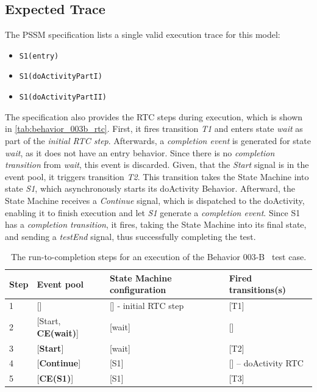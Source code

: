 \subsection{Expected Trace}

The PSSM specification lists a single valid execution trace for this model:

\begin{itemize}
    \item \verb|S1(entry)|
    \item \verb|S1(doActivityPartI)|
    \item \verb|S1(doActivityPartII)|
\end{itemize}

The specification also provides the RTC steps during execution, which is shown in \autoref{tab:behavior_003b_rtc}. First, it fires transition \emph{T1} and enters state \emph{wait} as part of the \emph{initial RTC step}. Afterwards, a \emph{completion event} is generated for state \emph{wait}, as it does not have an entry behavior. Since there is no \emph{completion transition} from \emph{wait}, this event is discarded. Given, that the \emph{Start} signal is in the event pool, it triggers transition \emph{T2}. This transition takes the State Machine into state \emph{S1}, which asynchronously starts its doActivity Behavior. Afterward, the State Machine receives a \emph{Continue} signal, which is dispatched to the doActivity, enabling it to finish execution and let \emph{S1} generate a \emph{completion event}. Since S1 has a \emph{completion transition}, it fires, taking the State Machine into its final state, and sending a \emph{testEnd} signal, thus successfully completing the test.

\begin{table}[htbp]
\centering
\begin{tabular}{|l||l|l|l|}
\hline
\textbf{Step} & \textbf{Event pool} & \textbf{State Machine configuration} & \textbf{Fired transitions(s)} \\ \hline\hline
1    & {[}{]}              & {[}{]} - initial RTC step   & {[}T1{]}             \\ \hline
2    & {[}Start, \textbf{CE(wait)}{]} & {[}wait{]}                    & {[}{]}               \\ \hline
3    & {[}\textbf{Start}{]}         & {[}wait{]}                    & {[}T2{]}             \\ \hline
4    & {[}\textbf{Continue}{]}         & {[}S1{]}                    & {[}{]} -- doActivity RTC             \\ \hline
5    & {[}\textbf{CE(S1)}{]}         & {[}S1{]}                    & {[}T3{]}             \\ \hline
\end{tabular}
\caption{The run-to-completion steps for an execution of the Behavior 003-B~\cite{pssm} test case.}
\label{tab:behavior_003b_rtc}
\end{table}

